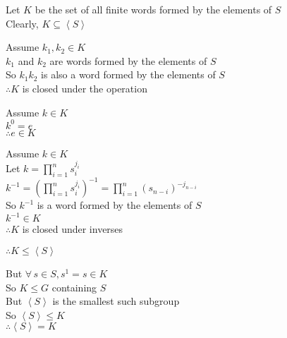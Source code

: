 \documentclass[letterpaper,12pt,fleqn]{article}
\newcommand{\cycle}[1]{\left<#1\right>}
\begin{document}
\begin{theproof}
  Let $K$ be the set of all finite words formed by the elements of $S$ \\
  Clearly, $K\subseteq\cycle{S}$

  Assume $k_1,k_2\in K$ \\
  $k_1$ and $k_2$ are words formed by the elements of $S$ \\
  So $k_1k_2$ is also a word formed by the elements of $S$ \\
  $\therefore K$ is closed under the operation

  Assume $k\in K$ \\
  $k^0=e$ \\
  $\therefore e\in K$

  Assume $k\in K$ \\
  Let $k=\prod_{i=1}^ns_i^{j_i}$ \\
  $k^{-1}=(\prod_{i=1}^ns_i^{j_i})^{-1}=\prod_{i=1}^n(s_{n-i})^{-j_{n-i}}$ \\
  So $k^{-1}$ is a word formed by the elements of $S$ \\
  $k^{-1}\in K$ \\
  $\therefore K$ is closed under inverses

  $\therefore K\le\cycle{S}$

  But $\forall\,s\in S,s^1=s\in K$ \\
  So $K\le G$ containing $S$ \\
  But $\cycle{S}$ is the smallest such subgroup \\
  So $\cycle{S}\le K$ \\

  $\therefore\cycle{S}=K$
\end{theproof}
\end{document}
